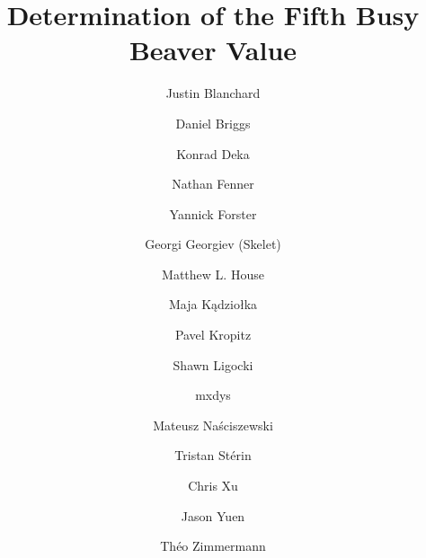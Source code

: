 \documentclass[sigconf,screen]{acmart}
\theoremstyle{definition} %
\numberwithin{equation}{section}
\theoremstyle{definition} %
\begin{document}
\title{Determination of the Fifth Busy Beaver Value}

\author{Justin Blanchard}

\author{Daniel Briggs}

\author{Konrad Deka}

\author{Nathan Fenner}

\author{Yannick Forster}

\author{Georgi Georgiev (Skelet)}

\author{Matthew L. House}

\author{Maja K\k{a}dzio{\l}ka}

\author{Pavel Kropitz}

\author{Shawn Ligocki}

\author{mxdys}

\author{Mateusz Na\'{s}ciszewski}

\author{Tristan St\'erin}

\author{Chris Xu}

\author{Jason Yuen}

\author{Th\'eo Zimmermann}

\renewcommand{\shortauthors}{{\small Blanchard, Briggs, Deka, Fenner, Forster, Georgiev, House, K\k{a}dzio{\l}ka, Kropitz, Ligocki, mxdys, Na\'{s}ciszewski, St\'erin, Xu, Yuen, Zimmermann\ \\}}
\end{document}
